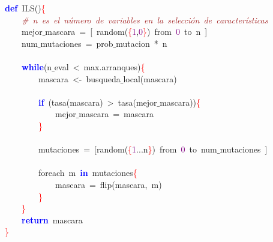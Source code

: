 \noindent
\mbox{}\textbf{\textcolor{Blue}{def}}\ ILS\textcolor{BrickRed}{()}\textcolor{Red}{\{} \\
\mbox{}\ \ \ \ \textit{\textcolor{Brown}{\#\ n\ es\ el\ número\ de\ variables\ en\ la\ selección\ de\ características}} \\
\mbox{}\ \ \ \ mejor$\_$mascara\ \textcolor{BrickRed}{=}\ \textcolor{BrickRed}{[}\ random\textcolor{BrickRed}{(}\textcolor{Red}{\{}\textcolor{Purple}{1}\textcolor{BrickRed}{,}\textcolor{Purple}{0}\textcolor{Red}{\}}\textcolor{BrickRed}{)}\ from\ \textcolor{Purple}{0}\ to\ n\ \textcolor{BrickRed}{]} \\
\mbox{}\ \ \ \ num$\_$mutaciones\ \textcolor{BrickRed}{=}\ prob$\_$mutacion\ \textcolor{BrickRed}{*}\ n \\
\mbox{} \\
\mbox{}\ \ \ \ \textbf{\textcolor{Blue}{while}}\textcolor{BrickRed}{(}n$\_$eval\ \textcolor{BrickRed}{\textless{}}\ max\textcolor{BrickRed}{.}arranques\textcolor{BrickRed}{)}\textcolor{Red}{\{} \\
\mbox{}\ \ \ \ \ \ \ \ mascara\ \textcolor{BrickRed}{\textless{}-}\ busqueda$\_$local\textcolor{BrickRed}{(}mascara\textcolor{BrickRed}{)} \\
\mbox{} \\
\mbox{}\ \ \ \ \ \ \ \ \textbf{\textcolor{Blue}{if}}\ \textcolor{BrickRed}{(}tasa\textcolor{BrickRed}{(}mascara\textcolor{BrickRed}{)}\ \textcolor{BrickRed}{\textgreater{}}\ tasa\textcolor{BrickRed}{(}mejor$\_$mascara\textcolor{BrickRed}{))}\textcolor{Red}{\{} \\
\mbox{}\ \ \ \ \ \ \ \ \ \ \ \ mejor$\_$mascara\ \textcolor{BrickRed}{=}\ mascara \\
\mbox{}\ \ \ \ \ \ \ \ \textcolor{Red}{\}} \\
\mbox{} \\
\mbox{}\ \ \ \ \ \ \ \ mutaciones\ \textcolor{BrickRed}{=}\ \textcolor{BrickRed}{[}random\textcolor{BrickRed}{(}\textcolor{Red}{\{}\textcolor{Purple}{1}\textcolor{BrickRed}{...}n\textcolor{Red}{\}}\textcolor{BrickRed}{)}\ from\ \textcolor{Purple}{0}\ to\ num$\_$mutaciones\ \textcolor{BrickRed}{]} \\
\mbox{} \\
\mbox{}\ \ \ \ \ \ \ \ foreach\ m\ \textbf{\textcolor{Blue}{in}}\ mutaciones\textcolor{Red}{\{} \\
\mbox{}\ \ \ \ \ \ \ \ \ \ \ \ mascara\ \textcolor{BrickRed}{=}\ flip\textcolor{BrickRed}{(}mascara\textcolor{BrickRed}{,}\ m\textcolor{BrickRed}{)} \\
\mbox{}\ \ \ \ \ \ \ \ \textcolor{Red}{\}} \\
\mbox{}\ \ \ \ \textcolor{Red}{\}} \\
\mbox{}\ \ \ \ \textbf{\textcolor{Blue}{return}}\ mascara \\
\mbox{}\textcolor{Red}{\}} \\
\mbox{}
